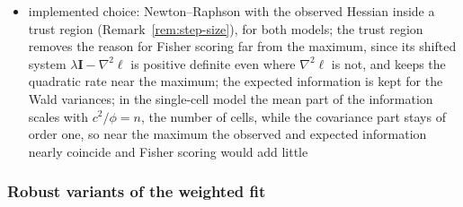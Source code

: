 \begin{itemize}
        step-halving (\(\Delta\boldsymbol{\theta},\Delta\boldsymbol{\theta}/2,\Delta\boldsymbol{\theta}/4,\ldots\) until \(\ell\) increases), a Fisher-scoring
        step whenever \(\boldsymbol{Q}\) lost positive definiteness, one scoring step to start Newton--Raphson and another whenever
        the increase in \(\ell\) exceeded 1, and partial steps up to the boundary of the variance components; on five
        problems, Newton--Raphson converged in four iterations from good starts on the fifth one, while from poor starts most
        early steps defaulted to scoring and its advantage largely vanished; the authors call the safeguards
        ``admittedly ad hoc'', and no method dominated
  \item implemented choice: Newton--Raphson with the observed Hessian inside a trust region (Remark~\ref{rem:step-size}), for
        both models; the trust region removes the reason for Fisher scoring far from the maximum, since its shifted system
        \(\lambda\mathbf{I}-\nabla^{2}\ell\) is positive definite even where \(\nabla^{2}\ell\) is not, and keeps the quadratic rate near the
        maximum; the expected information is kept for the Wald variances; in the single-cell model the mean part of the
        information scales with \(c^{2}/\phi=n\), the number of cells, while the covariance part stays of order one, so near the
        maximum the observed and expected information nearly coincide and Fisher scoring would add little
\end{itemize}

\subsubsection{Robust variants of the weighted fit}
\label{sec:robust}

